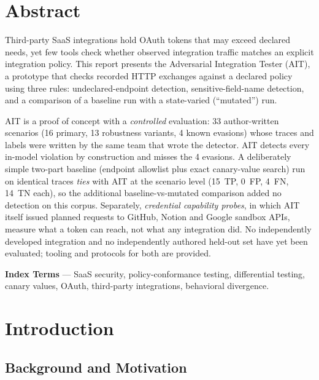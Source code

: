 \documentclass[12pt,a4paper]{report}
\begin{document}
\tableofcontents
\newpage

\chapter*{Abstract}

Third-party SaaS integrations hold OAuth tokens that may exceed declared needs, yet few tools
check whether observed integration traffic matches an explicit integration policy. This report
presents the Adversarial Integration Tester (AIT), a prototype that checks recorded HTTP
exchanges against a declared policy using three rules: undeclared-endpoint detection,
sensitive-field-name detection, and a comparison of a baseline run with a state-varied
(``mutated'') run.

AIT is a proof of concept with a \emph{controlled} evaluation: 33 author-written scenarios
(16 primary, 13 robustness variants, 4 known evasions) whose traces and labels were written by
the same team that wrote the detector. AIT detects every in-model violation by construction and
misses the 4 evasions. A deliberately simple two-part baseline (endpoint allowlist plus exact
canary-value search) run on identical traces \emph{ties} with AIT at the scenario level (15~TP,
0~FP, 4~FN, 14~TN each), so the additional baseline-vs-mutated comparison added no detection on
this corpus. Separately, \emph{credential capability probes}, in which AIT itself issued planned
requests to GitHub, Notion and Google sandbox APIs, measure what a token can reach, not what any
integration did. No independently developed integration and no independently authored held-out
set have yet been evaluated; tooling and protocols for both are provided.

\textbf{Index Terms} --- SaaS security, policy-conformance testing, differential testing,
canary values, OAuth, third-party integrations, behavioral divergence.

\chapter{Introduction}

\section{Background and Motivation}
\end{document}

